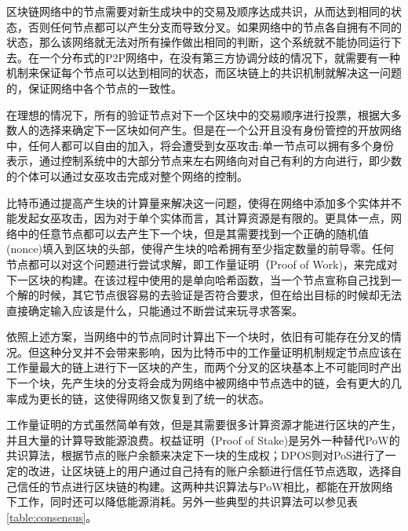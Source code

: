 区块链网络中的节点需要对新生成块中的交易及顺序达成共识，从而达到相同的状态，否则任何节点都可以产生分支而导致分叉。如果网络中的节点各自拥有不同的状态，那么该网络就无法对所有操作做出相同的判断，这个系统就不能协同运行下去。在一个分布式的P2P网络中，在没有第三方协调分歧的情况下，就需要有一种机制来保证每个节点可以达到相同的状态，而区块链上的共识机制就解决这一问题的，保证网络中各个节点的一致性。

在理想的情况下，所有的验证节点对下一个区块中的交易顺序进行投票，根据大多数人的选择来确定下一区块如何产生。但是在一个公开且没有身份管控的开放网络中，任何人都可以自由的加入，将会遭受到女巫攻击\cite{douceur2002sybil}:单一节点可以拥有多个身份表示，通过控制系统中的大部分节点来左右网络向对自己有利的方向进行，即少数的个体可以通过女巫攻击完成对整个网络的控制。

比特币通过提高产生块的计算量来解决这一问题，使得在网络中添加多个实体并不能发起女巫攻击，因为对于单个实体而言，其计算资源是有限的。更具体一点，网络中的任意节点都可以去产生下一个块，但是其需要找到一个正确的随机值(nonce)填入到区块的头部，使得产生块的哈希拥有至少指定数量的前导零\cite{antonopoulos2014mastering}。任何节点都可以对这个问题进行尝试求解，即工作量证明（Proof of Work)，来完成对下一区块的构建\cite{nakamoto2008bitcoin}。在该过程中使用的是单向哈希函数，当一个节点宣称自己找到一个解的时候，其它节点很容易的去验证是否符合要求，但在给出目标的时候却无法直接确定输入应该是什么，只能通过不断尝试来玩寻求答案。

依照上述方案，当网络中的节点同时计算出下一个块时，依旧有可能存在分叉的情况。但这种分叉并不会带来影响，因为比特币中的工作量证明机制规定节点应该在工作量最大的链上进行下一区块的产生，而两个分叉的区块基本上不可能同时产出下一个块，先产生块的分支将会成为网络中被网络中节点选中的链，会有更大的几率成为更长的链，这使得网络又恢复到了统一的状态。


工作量证明的方式虽然简单有效，但是其需要很多计算资源才能进行区块的产生，并且大量的计算导致能源浪费。权益证明（Proof of Stake)\cite{vasin2014blackcoin}是另外一种替代PoW的共识算法，根据节点的账户余额来决定下一块的生成权；DPOS则对PoS进行了一定的改进，让区块链上的用户通过自己持有的账户余额进行信任节点选取，选择自己信任的节点进行区块链的构建。这两种共识算法与PoW相比，都能在开放网络下工作，同时还可以降低能源消耗。另外一些典型的共识算法可以参见表\ref{table:consensus}。


